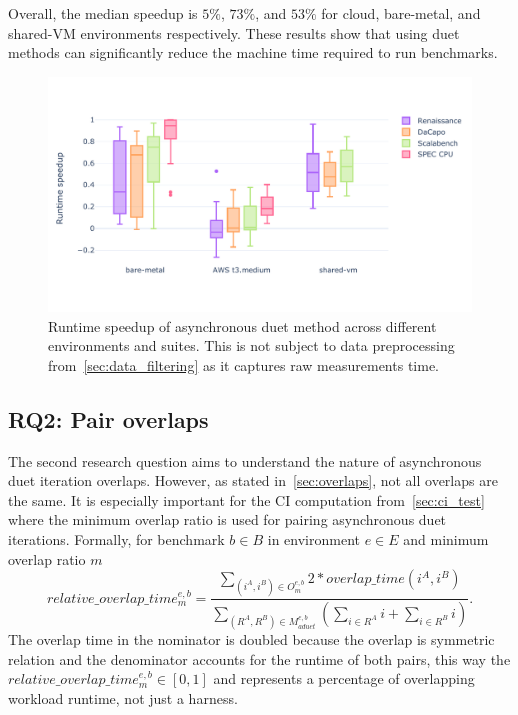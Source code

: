 Overall, the median speedup is $5\%$, $73\%$, and $53\%$ for cloud, bare-metal, and shared-VM environments respectively.
These results show that using duet methods can significantly reduce the machine time required to run benchmarks.

\begin{figure}
	\centering
	\includegraphics[width=.9\linewidth]{./figures/runtime_speedup.pdf}
	\caption{
		Runtime speedup of asynchronous duet method across different environments and suites.
		This is not subject to data preprocessing from~\cref{sec:data_filtering} as it captures raw measurements time.
	}
	\label{fig:runtime_speedup}
\end{figure}

\subsection{RQ2: Pair overlaps}
\label{sec:rq2}

The second research question aims to understand the nature of asynchronous duet iteration overlaps.
However, as stated in~\cref{sec:overlaps}, not all overlaps are the same.
It is especially important for the CI computation from~\ref{sec:ci_test} where the minimum overlap ratio is used for pairing asynchronous duet iterations.
Formally, for benchmark $b \in B$ in environment $e \in E$ and minimum overlap ratio $m$
$$
relative\_overlap\_time^{e, b}_m = \frac{\sum\limits_{(i^A, i^B) \in O^{e,b}_m} 2 * overlap\_time(i^A, i^B)}{\sum\limits_{(R^A, R^B) \in M^{e, b}_{aduet}}(\sum\limits_{i \in R^A} i + \sum\limits_{i \in R^B} i)}.
$$
The overlap time in the nominator is doubled because the overlap is symmetric relation and the denominator accounts for the runtime of both pairs, this way the $relative\_overlap\_time^{e, b}_m \in [0, 1]$ and represents a percentage of overlapping workload runtime, not just a harness.

